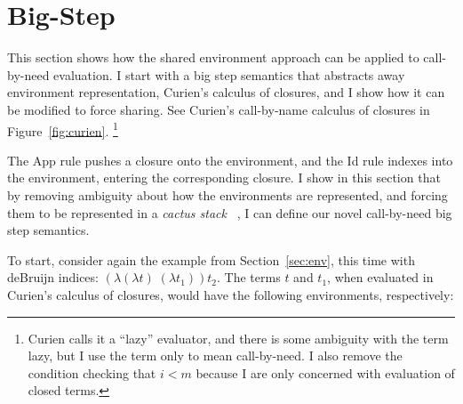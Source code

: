 \section{Big-Step \ce} \label{sec:calc}

This section shows how the shared environment approach can be applied to
call-by-need evaluation. I start with a big step semantics that abstracts away
environment representation, Curien's calculus of closures, and I show how it
can be modified to force sharing. See Curien's call-by-name calculus of closures
in Figure~\ref{fig:curien}. \footnote{Curien calls it a ``lazy'' evaluator, and
there is some ambiguity with the term lazy, but I use the term only to mean
call-by-need. I also remove the condition checking that $i < m$ because I are
only concerned with evaluation of closed terms.}

The App rule pushes a closure onto the environment, and the Id rule indexes
into the environment, entering the corresponding closure. I show in this
section that by removing ambiguity about how the environments are represented,
and forcing them to be represented in a \emph{cactus stack}
~\cite{stenstrom1988vlsi}, I can define our novel call-by-need big step semantics.

To start, consider again the example from Section~\ref{sec:env}, this time with
deBruijn indices: $(\lambda(\lambda t) \; (\lambda t_1)) t_2$.  The terms $t$
and $t_1$, when evaluated in Curien's calculus of closures, would have the
following environments, respectively: 

\begin{center}
\end{center}

